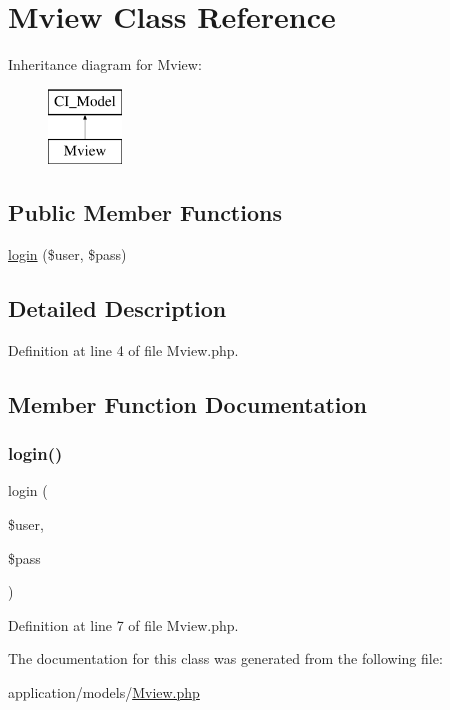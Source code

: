 \hypertarget{class_mview}{}\section{Mview Class Reference}
\label{class_mview}
Inheritance diagram for Mview\+:\begin{figure}[H]
\begin{center}
\leavevmode
\includegraphics[height=2.000000cm]{class_mview}
\end{center}
\end{figure}
\subsection*{Public Member Functions}
\begin{DoxyCompactItemize}
\item 
\mbox{\hyperlink{class_mview_a9d3c5bd5fb6402e1f59936be39dd9f6a}{login}} (\$user, \$pass)
\end{DoxyCompactItemize}


\subsection{Detailed Description}


Definition at line 4 of file Mview.\+php.



\subsection{Member Function Documentation}
\mbox{\label{class_mview_a9d3c5bd5fb6402e1f59936be39dd9f6a}} 
\subsubsection{\texorpdfstring{login()}{login()}}
{\footnotesize\ttfamily login (\begin{DoxyParamCaption}\item[{}]{\$user,  }\item[{}]{\$pass }\end{DoxyParamCaption})}



Definition at line 7 of file Mview.\+php.



The documentation for this class was generated from the following file\+:\begin{DoxyCompactItemize}
\item 
application/models/\mbox{\hyperlink{_mview_8php}{Mview.\+php}}\end{DoxyCompactItemize}
